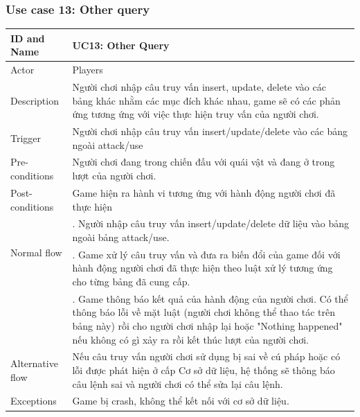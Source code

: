 \subsubsection{Use case 13: Other query}
\begin{center}
	\begin{tabular}{|l|p{12cm}|}
		\hline
		ID and Name & UC13: Other Query \\
		\hline
		Actor  & Players \\
		\hline
		Description  & Người chơi nhập câu truy vấn insert, update, delete vào các bảng khác nhằm các mục đích khác nhau, game sẽ có các phản ứng tương ứng với việc thực hiện truy vấn của người chơi.\\
		\hline
		Trigger  & Người chơi nhập câu truy vấn insert/update/delete vào các bảng ngoài attack/use\\
		\hline
		Pre-conditions & Người chơi đang trong chiến đấu với quái vật và đang ở trong lượt của người chơi.\\
		\hline
		Post-conditions & Game hiện ra hành vi tương ứng với hành động người chơi đã thực hiện\\
		\hline
		\multirow{2}{*}{Normal flow}      &\qquad 1. Người nhập câu truy vấn insert/update/delete dữ liệu vào bảng ngoài bảng attack/use.\\
		&\qquad 2. Game xử lý câu truy vấn và đưa ra biến đổi của game đối với hành động người chơi đã thực hiện theo luật xử lý tương ứng cho từng bảng đã cung cấp.\\
		&\qquad 3. Game thông báo kết quả của hành động của người chơi. Có thể thông báo lỗi về mặt luật (người chơi không thể thao tác trên bảng này) rồi cho người chơi nhập lại hoặc "Nothing happened" nếu không có gì xảy ra rồi kết thúc lượt của người chơi.\\
		\hline
		Alternative flow  & Nếu câu truy vấn người chơi sử dụng bị sai về cú pháp hoặc có lỗi được phát hiện ở cấp Cơ sở dữ liệu, hệ thống sẽ thông báo câu lệnh sai và người chơi có thể sửa lại câu lệnh.\\
		\hline
		Exceptions  & Game bị crash, không thể kết nối với cơ sở dữ liệu.\\
		\hline
	\end{tabular}
\end{center}
